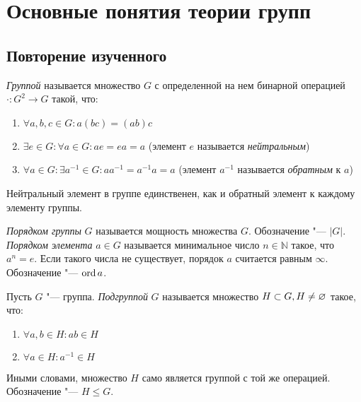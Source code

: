 \section{Основные понятия теории групп}

\subsection{Повторение изученного}

\begin{definition}
	\textit{Группой} называется множество $G$ с определенной на нем бинарной операцией $\cdot: G^2 \to G$ такой, что:
	\begin{enumerate}
		\item $\forall a, b, c \in G: a(bc) = (ab)c$
		
		\item $\exists e \in G: \forall a \in G: ae = ea = a$ (элемент $e$ называется \textit{нейтральным})
		
		\item $\forall a \in G: \exists a^{-1} \in G: aa^{-1} = a^{-1}a = a$ (элемент $a^{-1}$ называется \textit{обратным} к $a$)
	\end{enumerate}
\end{definition}

\begin{reminder}
	Нейтральный элемент в группе единственен, как и обратный элемент к каждому элементу группы.
\end{reminder}

\begin{definition}
	\textit{Порядком группы} $G$ называется мощность множества $G$. Обозначение "--- $|G|$. \textit{Порядком элемента} $a \in G$ называется минимальное число $n \in \mathbb{N}$ такое, что $a^n = e$. Если такого числа не существует, порядок $a$ считается равным $\infty$. Обозначение "--- $\operatorname{ord}{a}$.
\end{definition}

\begin{definition}
	Пусть $G$ "--- группа. \textit{Подгруппой} $G$ называется множество $H \subset G, H \hm\ne \emptyset$ такое, что:
	\begin{enumerate}
		\item $\forall a, b \in H: ab \in H$
		
		\item $\forall a \in H: a^{-1} \in H$
	\end{enumerate}
	
	Иными словами, множество $H$ само является группой с той же операцией. Обозначение "--- $H \le G$.
\end{definition}

